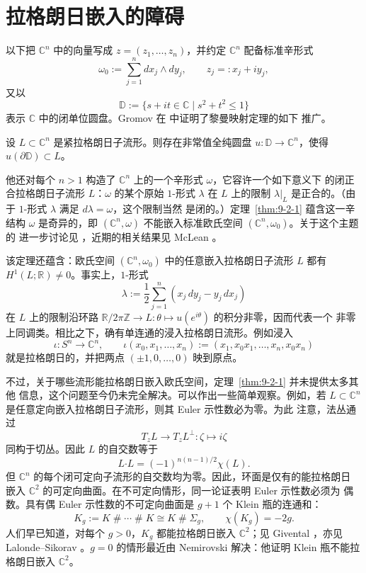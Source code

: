 
\section{拉格朗日嵌入的障碍}\label{sec:9-2}

以下把 $\mathbb C^n$ 中的向量写成 $z=(z_1,\ldots,z_n)$，并约定
$\mathbb C^n$ 配备标准辛形式
\[
  \omega_0:=\sum_{j=1}^n dx_j\wedge dy_j,
  \qquad z_j=:x_j+iy_j,
\]
又以
\[
  \mathbb D:=\{s+it\in\mathbb C\mid s^2+t^2\le 1\}
\]
表示 $\mathbb C$ 中的闭单位圆盘。Gromov 在  中证明了黎曼映射定理的如下
推广。

\begin{theorem}[Gromov]\label{thm:9-2-1}
设 $L\subset\mathbb C^n$ 是紧拉格朗日子流形。则存在非常值全纯圆盘
$u:\mathbb D\to\mathbb C^n$，使得 $u(\partial\mathbb D)\subset L$。
\end{theorem}

他还对每个 $n>1$ 构造了 $\mathbb C^n$ 上的一个辛形式 $\omega$，它容许一个如下意义下
的闭正合拉格朗日子流形 $L$：$\omega$ 的某个原始 $1$-形式 $\lambda$ 在 $L$ 上的限制
$\lambda|_L$ 是正合的。（由于 $1$-形式 $\lambda$ 满足 $d\lambda=\omega$，这个限制当然
是闭的。）定理~\ref{thm:9-2-1} 蕴含这一辛结构 $\omega$ 是奇异的，即
$(\mathbb C^n,\omega)$ 不能嵌入标准欧氏空间 $(\mathbb C^n,\omega_0)$。关于这个主题的
进一步讨论见 ，近期的相关结果见 McLean 。

该定理还蕴含：欧氏空间 $(\mathbb C^n,\omega_0)$ 中的任意嵌入拉格朗日子流形 $L$ 都有
$H^1(L;\mathbb R)\ne0$。事实上，$1$-形式
\[
  \lambda:=\frac12\sum_{j=1}^n(x_j\,dy_j-y_j\,dx_j)
\]
在 $L$ 上的限制沿环路
$\mathbb R/2\pi\mathbb Z\to L:\theta\mapsto u(e^{i\theta})$ 的积分非零，因而代表一个
非零上同调类。相比之下，确有单连通的浸入拉格朗日流形。例如浸入
\[
  \iota:S^n\longrightarrow\mathbb C^n,
  \qquad
  \iota(x_0,x_1,\ldots,x_n)
  :=(x_1,x_0x_1,\ldots,x_n,x_0x_n)
\]
就是拉格朗日的，并把两点 $(\pm1,0,\ldots,0)$ 映到原点。

不过，关于哪些流形能拉格朗日嵌入欧氏空间，定理~\ref{thm:9-2-1} 并未提供太多其他
信息，这个问题至今仍未完全解决。可以作出一些简单观察。例如，若
$L\subset\mathbb C^n$ 是任意定向嵌入拉格朗日子流形，则其 Euler 示性数必为零。为此
注意，法丛通过
\[
  T_zL\longrightarrow T_zL^\perp:\zeta\longmapsto i\zeta
\]
同构于切丛。因此 $L$ 的自交数等于
\[
  L\mathbin{\boldsymbol\cdot}L=(-1)^{n(n-1)/2}\chi(L).
\]
但 $\mathbb C^n$ 的每个闭可定向子流形的自交数均为零。因此，环面是仅有的能拉格朗日
嵌入 $\mathbb C^2$ 的可定向曲面。在不可定向情形，同一论证表明 Euler 示性数必须为
偶数。具有偶 Euler 示性数的不可定向曲面是 $g+1$ 个 Klein 瓶的连通和：
\[
  K_g:=K\mathbin{\#}\cdots\mathbin{\#}K
  \cong K\mathbin{\#}\Sigma_g,
  \qquad \chi(K_g)=-2g.
\]
人们早已知道，对每个 $g>0$，$K_g$ 都能拉格朗日嵌入 $\mathbb C^2$；见 Givental
，亦见 Lalonde--Sikorav 。$g=0$ 的情形最近由 Nemirovski
 解决：他证明 Klein 瓶不能拉格朗日嵌入 $\mathbb C^2$。

